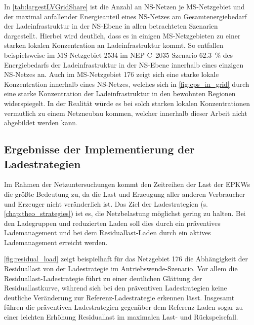 


In \autoref{tab:largestLVGridShare} ist die Anzahl an \gls{NS}-Netzen je \gls{MS}-Netzgebiet und der maximal anfallender Energieanteil eines \gls{NS}-Netzes am Gesamtenergiebedarf der Ladeinfrastruktur in der \gls{NS}-Ebene in allen betrachteten Szenarien dargestellt.
Hierbei wird deutlich, dass es in einigen \gls{MS}-Netzgebieten zu einer starken lokalen Konzentration an Ladeinfrastruktur kommt.
So entfallen beispielsweise im \gls{MS}-Netzgebiet \num{2534} im NEP C~\num{2035} Szenario \SI{62.3}{\percent} des Energiebedarfs der Ladeinfrastruktur in der \gls{NS}-Ebene innerhalb eines einzigen \gls{NS}-Netzes an.
Auch im \gls{MS}-Netzgebiet \num{176} zeigt sich eine starke lokale Konzentration innerhalb eines \gls{NS}-Netzes, welches sich in \autoref{fig:cps_in_grid} durch eine starke Konzentration der Ladeinfrastruktur in den bewohnten Regionen widerspiegelt.
In der Realität würde es bei solch starken lokalen Konzentrationen vermutlich zu einem Netzneubau kommen, welcher innerhalb dieser Arbeit nicht abgebildet werden kann.




\subsection{Ergebnisse der Implementierung der Ladestrategien}\label{chap:results_charging_strategies}

Im Rahmen der Netzuntersuchungen kommt den Zeitreihen der Last der \glspl{EPKW} die größte Bedeutung zu, da die Last und Erzeugung aller anderen Verbraucher und Erzeuger nicht veränderlich ist.
Das Ziel der Ladestrategien (s. \autoref{chap:theo_strategies}) ist es, die Netzbelastung möglichst gering zu halten.
Bei den Ladegruppen und reduzierten Laden soll dies durch ein präventives Lademanagement und bei dem Residuallast-Laden durch ein aktives Lademanagement erreicht werden.



\autoref{fig:residual_load} zeigt beispielhaft für das Netzgebiet \num{176} die Abhängigkeit der Residuallast von der Ladestrategie im Antriebswende-Szenario.
Vor allem die Residuallast-Ladestrategie führt zu einer deutlichen Glättung der Residuallastkurve, während sich bei den präventiven Ladestrategien keine deutliche Veränderung zur Referenz-Ladestrategie erkennen lässt.
Insgesamt führen die präventiven Ladestrategien gegenüber dem Referenz-Laden sogar zu einer leichten Erhöhung Residuallast im maximalen Last- und Rückspeisefall.\medskip

